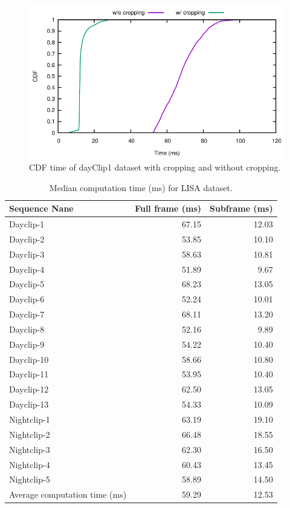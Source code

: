 \begin{figure}[ht!]
  \centering
  \includegraphics[width=5.2in]{plots/lisaday1_cdf.pdf}
  \caption{CDF time of dayClip1 dataset with cropping and without cropping.}
  \label{f:lisa_cdf}
\end{figure}

\begin{table}[!ht]
  \centering
  \caption{Median computation time (ms) for LISA dataset.}
  \label{t:lisa_time}
  \begin{tabular}{  l   r   r }
    \rowcolor{gray!50}
    Sequence Nane &  Full frame (ms)  &  Subframe (ms) \\
    \hline
    Dayclip-1 & 67.15 & 12.03 \\
    Dayclip-2 & 53.85 & 10.10 \\
    Dayclip-3 & 58.63 & 10.81 \\
    Dayclip-4 & 51.89 & 9.67 \\
    Dayclip-5 & 68.23 & 13.05 \\
    Dayclip-6 & 52.24 & 10.01 \\
    Dayclip-7 & 68.11  & 13.20 \\
    Dayclip-8 & 52.16  & 9.89  \\
    Dayclip-9 & 54.22  & 10.40  \\
    Dayclip-10 & 58.66 & 10.80 \\
    Dayclip-11 & 53.95 & 10.40 \\
    Dayclip-12 & 62.50  & 13.05 \\
    Dayclip-13 & 54.33 & 10.09 \\
    Nightclip-1 & 63.19 & 19.10 \\
    Nightclip-2 & 66.48 & 18.55 \\
    Nightclip-3 & 62.30 & 16.50 \\
    Nightclip-4 & 60.43 & 13.45 \\
    Nightclip-5 & 58.89 & 14.50 \\
    \hline
    Average computation time (ms) & 59.29 & 12.53 \\
    
  \end{tabular}
\end{table}

